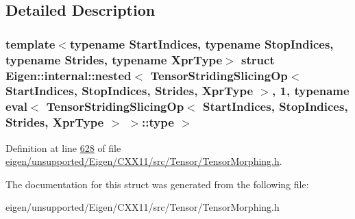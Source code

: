 \subsection{Detailed Description}
\subsubsection*{template$<$typename Start\+Indices, typename Stop\+Indices, typename Strides, typename Xpr\+Type$>$\newline
struct Eigen\+::internal\+::nested$<$ Tensor\+Striding\+Slicing\+Op$<$ Start\+Indices, Stop\+Indices, Strides, Xpr\+Type $>$, 1, typename eval$<$ Tensor\+Striding\+Slicing\+Op$<$ Start\+Indices, Stop\+Indices, Strides, Xpr\+Type $>$ $>$\+::type $>$}



Definition at line \hyperlink{eigen_2unsupported_2_eigen_2_c_x_x11_2src_2_tensor_2_tensor_morphing_8h_source_l00628}{628} of file \hyperlink{eigen_2unsupported_2_eigen_2_c_x_x11_2src_2_tensor_2_tensor_morphing_8h_source}{eigen/unsupported/\+Eigen/\+C\+X\+X11/src/\+Tensor/\+Tensor\+Morphing.\+h}.



The documentation for this struct was generated from the following file\+:\begin{DoxyCompactItemize}
\item 
eigen/unsupported/\+Eigen/\+C\+X\+X11/src/\+Tensor/\+Tensor\+Morphing.\+h\end{DoxyCompactItemize}

